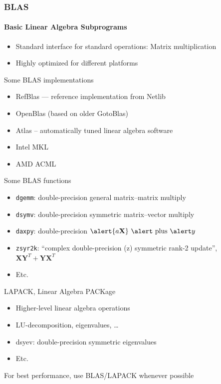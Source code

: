 \documentclass[usenames,dvipsnames,mathserif,compress]{beamer}
\begin{document}
\begin{frame}
  \frametitle{BLAS}
  \framesubtitle{Basic Linear Algebra Subprograms}
  \begin{itemize}
  \item Standard interface for standard operations:
    Matrix multiplication
  \item Highly optimized for different platforms
  \end{itemize}
  \begin{block}{Some BLAS implementations}
    \begin{itemize}
    \item RefBlas --- reference implementation from Netlib
    \item OpenBlas (based on older GotoBlas)
    \item Atlas -- automatically tuned linear algebra software
    \item Intel MKL
    \item AMD ACML
    \end{itemize}
  \end{block}
\end{frame}

\begin{frame}
  \begin{block}{Some BLAS functions}
    \begin{itemize}
    \item \texttt{dgemm}: \alert double-precision \alert{ge}neral \alert matrix--\alert matrix multiply
    \item \texttt{dsymv}: \alert double-precision \alert{sy}mmetric \alert matrix--\alert vector multiply
    \item \texttt{daxpy}: double-precision $\alert{a \mathbf X}\textrm{ \alert plus } \alert y$
    \item \texttt{zsyr2k}: ``complex double-precision (\alert z) \alert{sy}mmetric \alert ran\alert{k-2} update'',
      $\mathbf X \mathbf Y^T + \mathbf Y \mathbf X^T$
    \item Etc.
    \end{itemize}
  \end{block}
  \begin{block}{LAPACK, Linear Algebra PACKage}
    \begin{itemize}
    \item Higher-level linear algebra operations
    \item LU-decomposition, eigenvalues, \ldots
    \item dsyev: \alert double-precision \alert{sy}mmetric \alert eigen{\alert v}alues
    \item Etc.
    \end{itemize}
  \end{block}
  For best performance, use BLAS/LAPACK whenever possible
\end{frame}
\end{document}
